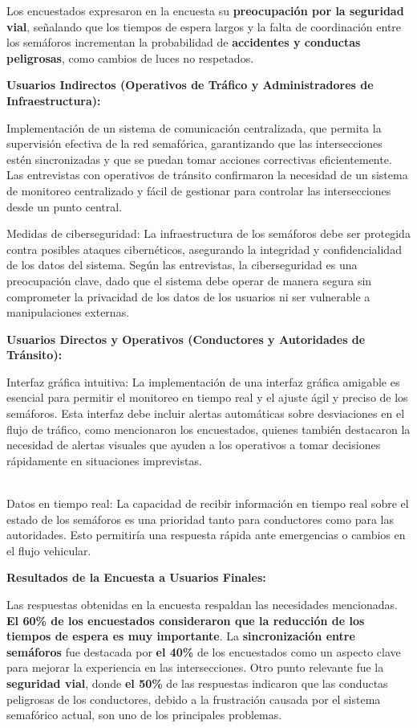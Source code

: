 \documentclass[12pt,a4paper,oneside]{report}
\begin{document}
Los encuestados expresaron en la encuesta su \textbf{preocupación por la seguridad vial}, señalando que los tiempos de espera largos y la falta de coordinación entre los semáforos incrementan la probabilidad de \textbf{accidentes y conductas peligrosas}, como cambios de luces no respetados.

\textbf{Usuarios Indirectos (Operativos de Tráfico y Administradores de Infraestructura):}

Implementación de un sistema de comunicación centralizada, que permita la supervisión efectiva de la red semafórica, garantizando que las intersecciones estén sincronizadas y que se puedan tomar acciones correctivas eficientemente. Las entrevistas con operativos de tránsito confirmaron la necesidad de un sistema de monitoreo centralizado y fácil de gestionar para controlar las intersecciones desde un punto central.

Medidas de ciberseguridad: La infraestructura de los semáforos debe ser protegida contra posibles ataques cibernéticos, asegurando la integridad y confidencialidad de los datos del sistema. Según las entrevistas, la ciberseguridad es una preocupación clave, dado que el sistema debe operar de manera segura sin comprometer la privacidad de los datos de los usuarios ni ser vulnerable a manipulaciones externas.

\textbf{Usuarios Directos y Operativos (Conductores y Autoridades de Tránsito):}

Interfaz gráfica intuitiva: La implementación de una interfaz gráfica amigable es esencial para permitir el monitoreo en tiempo real y el ajuste ágil y preciso de los semáforos. Esta interfaz debe incluir alertas automáticas sobre desviaciones en el flujo de tráfico, como mencionaron los encuestados, quienes también destacaron la necesidad de alertas visuales que ayuden a los operativos a tomar decisiones rápidamente en situaciones imprevistas.\\
\strut \\
Datos en tiempo real: La capacidad de recibir información en tiempo real sobre el estado de los semáforos es una prioridad tanto para conductores como para las autoridades. Esto permitiría una respuesta rápida ante emergencias o cambios en el flujo vehicular.

\textbf{Resultados de la Encuesta a Usuarios Finales:}

Las respuestas obtenidas en la encuesta respaldan las necesidades mencionadas. \textbf{El 60\% de los encuestados consideraron que la reducción de los tiempos de espera es muy importante}. La \textbf{sincronización entre semáforos} fue destacada por \textbf{el 40\%} de los encuestados como un aspecto clave para mejorar la experiencia en las intersecciones. Otro punto relevante fue la \textbf{seguridad vial}, donde \textbf{el 50\%} de las respuestas indicaron que las conductas peligrosas de los conductores, debido a la frustración causada por el sistema semafórico actual, son uno de los principales problemas.
\end{document}
